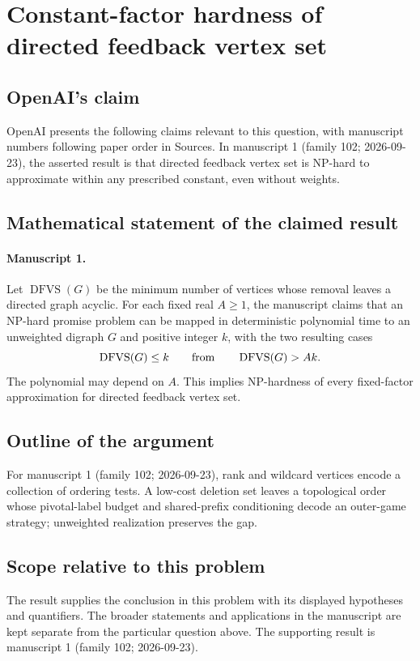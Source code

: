 \documentclass[11pt]{article}
\begin{document}
\section*{Constant-factor hardness of directed feedback vertex set}

\subsection{OpenAI's claim}
OpenAI presents the following claims relevant to this question, with manuscript numbers following paper order in Sources. In manuscript 1 (family 102; 2026-09-23), the asserted result is that directed feedback vertex set is NP-hard to approximate within any prescribed constant, even without weights.

\subsection{Mathematical statement of the claimed result}
\paragraph{Manuscript 1.}
Let $\operatorname{DFVS}(G)$ be the minimum number of vertices whose removal leaves a directed graph acyclic. For each fixed real $A\ge1$, the manuscript claims that an NP-hard promise problem can be mapped in deterministic polynomial time to an unweighted digraph $G$ and positive integer $k$, with the two resulting cases
\[
 \operatorname{DFVS}(G)\le k\qquad\hbox{from}\qquad\operatorname{DFVS}(G)>Ak.
\]
The polynomial may depend on $A$. This implies NP-hardness of every fixed-factor approximation for directed feedback vertex set.

\subsection{Outline of the argument}
For manuscript 1 (family 102; 2026-09-23), rank and wildcard vertices encode a collection of ordering tests. A low-cost deletion set leaves a topological order whose pivotal-label budget and shared-prefix conditioning decode an outer-game strategy; unweighted realization preserves the gap.

\subsection{Scope relative to this problem}
The result supplies the conclusion in this problem with its displayed hypotheses and quantifiers. The broader statements and applications in the manuscript are kept separate from the particular question above. The supporting result is manuscript 1 (family 102; 2026-09-23).
\end{document}
